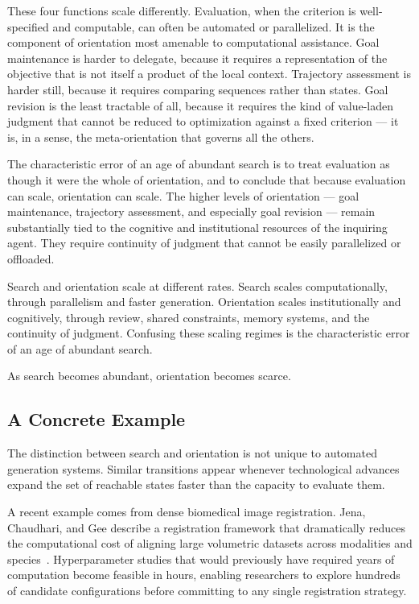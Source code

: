 These four functions scale differently. Evaluation, when the criterion is
well-specified and computable, can often be automated or parallelized. It is
the component of orientation most amenable to computational assistance. Goal
maintenance is harder to delegate, because it requires a representation of
the objective that is not itself a product of the local context. Trajectory
assessment is harder still, because it requires comparing sequences rather
than states. Goal revision is the least tractable of all, because it requires
the kind of value-laden judgment that cannot be reduced to optimization against
a fixed criterion --- it is, in a sense, the meta-orientation that governs
all the others.

The characteristic error of an age of abundant search is to treat evaluation
as though it were the whole of orientation, and to conclude that because
evaluation can scale, orientation can scale. The higher levels of orientation
--- goal maintenance, trajectory assessment, and especially goal revision ---
remain substantially tied to the cognitive and institutional resources of the
inquiring agent. They require continuity of judgment that cannot be easily
parallelized or offloaded.

\begin{principle}
Search and orientation scale at different rates. Search scales computationally,
through parallelism and faster generation. Orientation scales institutionally
and cognitively, through review, shared constraints, memory systems, and the
continuity of judgment. Confusing these scaling regimes is the characteristic
error of an age of abundant search.
\end{principle}

\begin{principle}
As search becomes abundant, orientation becomes scarce.
\end{principle}

\subsection*{A Concrete Example}

The distinction between search and orientation is not unique to automated
generation systems. Similar transitions appear whenever technological advances
expand the set of reachable states faster than the capacity to evaluate them.

A recent example comes from dense biomedical image registration. Jena,
Chaudhari, and Gee describe a registration framework that dramatically reduces
the computational cost of aligning large volumetric datasets across modalities
and species~\cite{fireants2026}. Hyperparameter studies that would previously
have required years of computation become feasible in hours, enabling researchers
to explore hundreds of candidate configurations before committing to any single
registration strategy.

